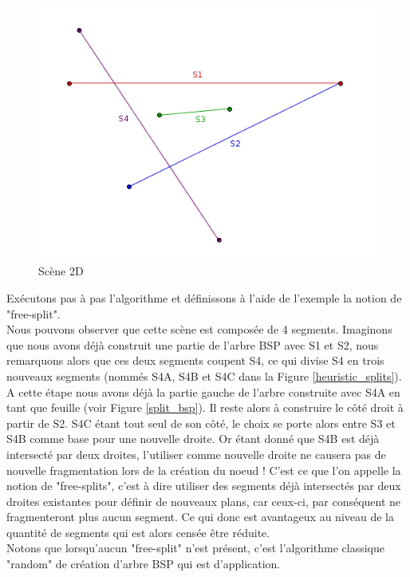 \documentclass[11pt,a4paper]{article}
\begin{document}
\begin{figure}[!h]
\centering
\includegraphics[scale=0.5]{free_splits_2.png}
\caption{Scène 2D}
\label{scene_splits}
\end{figure}

Exécutons pas à pas l'algorithme et définissons à l'aide de l'exemple la notion de "free-split". \\

Nous pouvons observer que cette scène est composée de 4 segments. Imaginons que nous avons déjà construit une partie de l'arbre BSP avec S1 et S2, nous remarquons alors que ces deux segments coupent S4, ce qui divise S4 en trois nouveaux segments (nommés S4A, S4B et S4C dans la Figure \ref{heuristic_splits}). A cette étape nous avons déjà la partie gauche de l'arbre construite avec S4A en tant que feuille (voir Figure \ref{split_bsp}). Il reste alors à construire le côté droit à partir de S2. S4C étant tout seul de son côté, le choix se porte alors entre S3 et S4B comme base pour une nouvelle droite. Or étant donné que S4B est déjà intersecté par deux droites, l'utiliser comme nouvelle droite ne causera pas de nouvelle fragmentation lors de la création du noeud ! C'est ce que l'on appelle la notion de "free-splits", c'est à dire utiliser des segments déjà intersectés par deux droites existantes pour définir de nouveaux plans, car ceux-ci, par conséquent ne fragmenteront plus aucun segment. Ce qui donc est avantageux au niveau de la quantité de segments qui est alors censée être réduite.\\

Notons que lorsqu'aucun "free-split" n'est présent, c'est l'algorithme classique "random" de création d'arbre BSP qui est d'application. 
\end{document}
